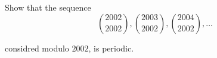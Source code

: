 Show that the sequence\[\binom{2002}{2002},\binom{2003}{2002},\binom{2004}{2002},\ldots \]

considred modulo $2002$,  is periodic.
